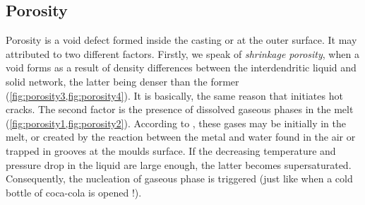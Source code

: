 \subsection*{Porosity}
%
Porosity is a void defect formed inside the casting or at the outer surface. It may attributed to two different factors.
Firstly, we speak of \emph{shrinkage porosity}, when a void forms as a result of density 
differences between the interdendritic liquid and solid network, the latter being denser 
than the former (\cref{fig:porosity3,fig:porosity4}). It is basically, the same reason that initiates hot cracks. 
The second factor is the presence of dissolved gaseous phases in the melt (\cref{fig:porosity1,fig:porosity2}). 
According to \citet{dantzig_solidification_2009}, these gases may be initially in the melt, or created by the 
reaction between the metal and water found in the air or trapped in grooves at the moulds surface. If the 
decreasing temperature and pressure drop in the liquid are large enough, the latter becomes supersaturated. 
Consequently, the nucleation of gaseous phase is triggered (just like when a cold bottle of coca-cola is opened !).
